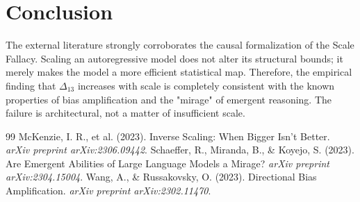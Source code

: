 \documentclass[12pt,a4paper]{article}
\begin{document}
\section{Conclusion}

The external literature strongly corroborates the causal formalization of the Scale Fallacy. Scaling an autoregressive model does not alter its structural bounds; it merely makes the model a more efficient statistical map. Therefore, the empirical finding that $\Delta_{13}$ increases with scale is completely consistent with the known properties of bias amplification and the "mirage" of emergent reasoning. The failure is architectural, not a matter of insufficient scale.

\begin{thebibliography}{99}
 McKenzie, I. R., et al. (2023). Inverse Scaling: When Bigger Isn't Better. \emph{arXiv preprint arXiv:2306.09442}.
 Schaeffer, R., Miranda, B., \& Koyejo, S. (2023). Are Emergent Abilities of Large Language Models a Mirage? \emph{arXiv preprint arXiv:2304.15004}.
 Wang, A., \& Russakovsky, O. (2023). Directional Bias Amplification. \emph{arXiv preprint arXiv:2302.11470}.
\end{thebibliography}
\end{document}
